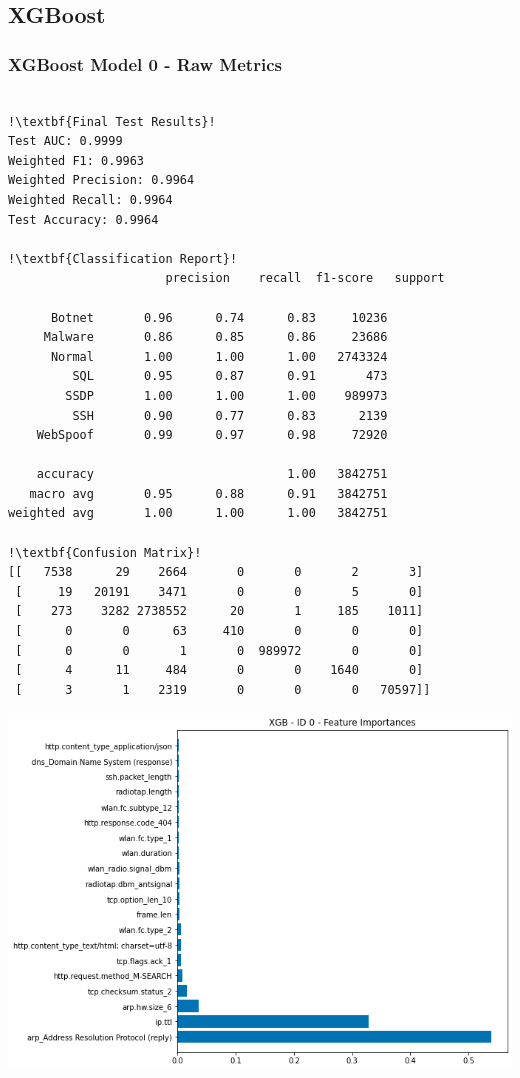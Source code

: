 \begin{appendices}

\newpage
\subsection{XGBoost}
\label{appx:XGBoost}


\subsubsection{XGBoost Model 0 - Raw Metrics}
\begin{lstlisting}[escapechar=!]

!\textbf{Final Test Results}!
Test AUC: 0.9999
Weighted F1: 0.9963
Weighted Precision: 0.9964
Weighted Recall: 0.9964
Test Accuracy: 0.9964

!\textbf{Classification Report}!
			          precision    recall  f1-score   support

      Botnet       0.96      0.74      0.83     10236
     Malware       0.86      0.85      0.86     23686
      Normal       1.00      1.00      1.00   2743324
         SQL       0.95      0.87      0.91       473
        SSDP       1.00      1.00      1.00    989973
         SSH       0.90      0.77      0.83      2139
    WebSpoof       0.99      0.97      0.98     72920

    accuracy                           1.00   3842751
   macro avg       0.95      0.88      0.91   3842751
weighted avg       1.00      1.00      1.00   3842751
    
!\textbf{Confusion Matrix}!    
[[   7538      29    2664       0       0       2       3]
 [     19   20191    3471       0       0       5       0]
 [    273    3282 2738552      20       1     185    1011]
 [      0       0      63     410       0       0       0]
 [      0       0       1       0  989972       0       0]
 [      4      11     484       0       0    1640       0]
 [      3       1    2319       0       0       0   70597]]

\end{lstlisting}

\begin{center}
	\centering
	\includegraphics[width=\textwidth]{Appendices/Images/XGB/Model0/XGB_Model0_FI.png}
\end{center}



\end{appendices}
